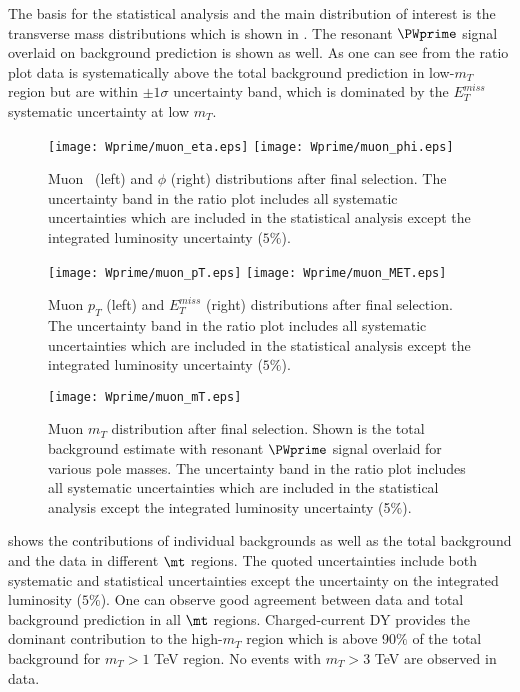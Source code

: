 The basis for the statistical analysis and the main distribution of interest 
is the transverse mass distributions which is shown in .
The resonant $\PWprime$ signal overlaid on background prediction is shown as well.
As one can see from the ratio plot data is systematically above the total background prediction
in low-$m_T$ region but are within $\pm 1 \sigma$ uncertainty band, which is dominated by the $E_T^{miss}$ systematic uncertainty at low $m_T$.

\begin{figure}[]
  \centering
  \texttt{[image: Wprime/muon\_eta.eps]}
  \texttt{[image: Wprime/muon\_phi.eps]}
  \caption{
  Muon \eta\ (left) and $\phi$ (right) distributions after final selection. The uncertainty band in the ratio plot includes all systematic uncertainties which are included in the statistical analysis except the integrated luminosity uncertainty ($5\%$).
}
  \label{fig:mu_results_etaphi}
\end{figure}

\begin{figure}[]
  \centering
  \texttt{[image: Wprime/muon\_pT.eps]}
  \texttt{[image: Wprime/muon\_MET.eps]}
 \caption{
 Muon $p_T$ (left) and $E_T^{miss}$ (right) distributions after final selection. The uncertainty band in the ratio plot includes all systematic uncertainties which are included in the statistical analysis except the integrated luminosity uncertainty ($5\%$).
}
  \label{fig:mu_results_ptmet}
\end{figure}


\begin{figure}[]
  \centering
  \texttt{[image: Wprime/muon\_mT.eps]}
  \caption{
  Muon $m_T$ distribution after final selection. 
  Shown is the total background estimate with resonant $\PWprime$ signal overlaid for various pole masses. 
  The uncertainty band in the ratio plot includes all systematic uncertainties which are included in the statistical analysis except the integrated luminosity uncertainty (5$\%$).}
  \label{fig:MT_mu_Wprime}
\end{figure}

shows the contributions of individual backgrounds as well as the total background
and the data in different $\mt$ regions. The quoted uncertainties include both systematic and
statistical uncertainties except the uncertainty on the integrated luminosity ($5\%$).
One can observe good agreement between data and total background prediction in all $\mt$ regions. Charged-current DY provides the dominant contribution to the high-$m_T$ region which is above 90$\%$ of the total background for $m_T>1$ TeV region. No events with $m_T > 3$ TeV are observed in data.

